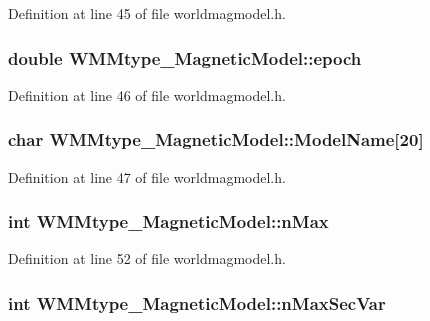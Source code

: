 \-Definition at line 45 of file worldmagmodel.\-h.

\hypertarget{struct_w_m_mtype___magnetic_model_ad2771cf6f5255fee58bff61029680f82}{
\subsubsection[{epoch}]{\setlength{\rightskip}{0pt plus 5cm}double {\bf \-W\-M\-Mtype\-\_\-\-Magnetic\-Model\-::epoch}}}\label{struct_w_m_mtype___magnetic_model_ad2771cf6f5255fee58bff61029680f82}


\-Definition at line 46 of file worldmagmodel.\-h.

\hypertarget{struct_w_m_mtype___magnetic_model_a11d5a44016770e140c397467b40c7755}{
\subsubsection[{\-Model\-Name}]{\setlength{\rightskip}{0pt plus 5cm}char {\bf \-W\-M\-Mtype\-\_\-\-Magnetic\-Model\-::\-Model\-Name}\mbox{[}20\mbox{]}}}\label{struct_w_m_mtype___magnetic_model_a11d5a44016770e140c397467b40c7755}


\-Definition at line 47 of file worldmagmodel.\-h.

\hypertarget{struct_w_m_mtype___magnetic_model_a3cea165ace9c22b7301ac75ae8cacedb}{
\subsubsection[{n\-Max}]{\setlength{\rightskip}{0pt plus 5cm}int {\bf \-W\-M\-Mtype\-\_\-\-Magnetic\-Model\-::n\-Max}}}\label{struct_w_m_mtype___magnetic_model_a3cea165ace9c22b7301ac75ae8cacedb}


\-Definition at line 52 of file worldmagmodel.\-h.

\hypertarget{struct_w_m_mtype___magnetic_model_a8a16d64376b1a82317aaffc2917271bb}{
\subsubsection[{n\-Max\-Sec\-Var}]{\setlength{\rightskip}{0pt plus 5cm}int {\bf \-W\-M\-Mtype\-\_\-\-Magnetic\-Model\-::n\-Max\-Sec\-Var}}}\label{struct_w_m_mtype___magnetic_model_a8a16d64376b1a82317aaffc2917271bb}


